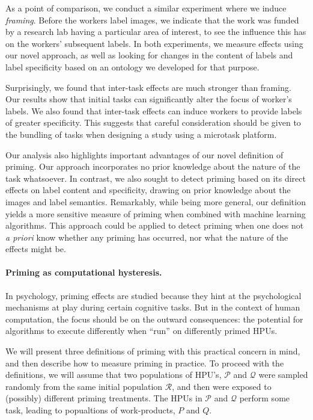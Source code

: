 \documentclass[12pt]{article}
\begin{document}
As a point of comparison, we conduct a similar experiment where we induce 
\textit{framing}. Before the workers label images, we indicate that the work 
was funded by a research lab having a particular area of interest, to see the 
influence this has on the workers’ subsequent labels. In both experiments, we 
measure effects using our novel approach, as well as looking for changes in 
the content of labels and label specificity based on an ontology we developed 
for that purpose.

Surprisingly, we found that inter-task effects are much stronger than framing. 
Our results show that initial tasks can significantly alter the focus of 
worker's labels. We also found that inter-task effects can induce workers to 
provide labels of greater specificity. This suggests that careful consideration
should be given to the bundling of tasks when designing a study using a
microtask platform.

Our analysis also highlights important advantages of our novel definition of 
priming.  Our approach incorporates no prior knowledge about the nature
of the task whatsoever.  In contrast, we also sought to detect priming
based on its direct effects on label content and specificity,
drawing on prior knowledge about the images and label semantics.
Remarkably, while being more general, our definition yields a more sensitive
measure of priming when combined with machine learning algorithms. 
This approach could be applied to detect priming when one does not 
\emph{a priori} know whether any priming has occurred, 
nor what the nature of the effects might be.

\paragraph*{Priming as computational hysteresis.}
In psychology, priming effects are studied because they hint at the 
psychological mechanisms at play during certain cognitive tasks. But in the 
context of human computation, the focus should be on the outward consequences: 
the potential for algorithms to execute differently when ``run'' on differently
primed HPUs.

We will present three definitions of priming with this practical concern in 
mind, and then describe how to measure priming in practice. To proceed with 
the definitions, we will assume that two populations of HPU’s, $\mathcal{P}$ 
and $\mathcal{Q}$ were 
sampled randomly from the same initial population $\mathcal{R}$, and then were 
exposed to (possibly) different priming treatments. The HPUs in $\mathcal{P}$ 
and $\mathcal{Q}$ perform some 
task, leading to popualtions of work-products, $P$ and $Q$.
\end{document}
